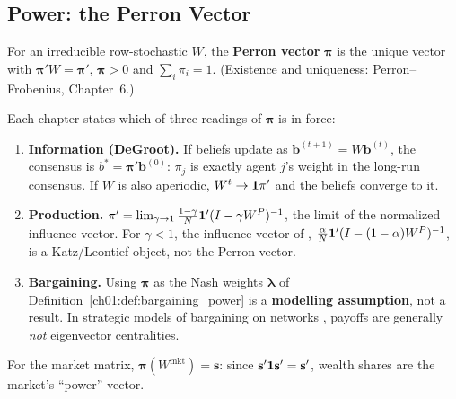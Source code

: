 \documentclass[../structural_economics_book.tex]{subfiles}
\begin{document}
\subsection{Power: the Perron Vector}

\begin{definition}\label{ch01:def:perron}
For an irreducible row-stochastic $W$, the \textbf{Perron vector} $\boldsymbol{\pi}$ is the unique vector with $\boldsymbol{\pi}'W = \boldsymbol{\pi}'$, $\boldsymbol{\pi} > 0$ and $\sum_i \pi_i = 1$. (Existence and uniqueness: Perron--Frobenius, Chapter~6.)
\end{definition}

Each chapter states which of three readings of $\boldsymbol{\pi}$ is in force:
\begin{enumerate}
\item \textbf{Information (DeGroot).} If beliefs update as $\mathbf{b}^{(t+1)} = W\mathbf{b}^{(t)}$, the consensus is $b^* = \boldsymbol{\pi}'\mathbf{b}^{(0)}$: $\pi_j$ is exactly agent $j$'s weight in the long-run consensus. If $W$ is also aperiodic, $W^t \to \mathbf{1}\pi'$ and the beliefs converge to it.
\item \textbf{Production.} $\pi' = \lim_{\gamma \to 1} \frac{1-\gamma}{N}\mathbf{1}'(I - \gamma W^P)^{-1}$, the limit of the normalized influence vector. For $\gamma < 1$, the influence vector of \citet{acemoglu2012network}, $\frac{\alpha}{N}\mathbf{1}'(I - (1-\alpha)W^P)^{-1}$, is a Katz/Leontief object, not the Perron vector.
\item \textbf{Bargaining.} Using $\boldsymbol{\pi}$ as the Nash weights $\boldsymbol{\lambda}$ of Definition~\ref{ch01:def:bargaining_power} is a \textbf{modelling assumption}, not a result. In strategic models of bargaining on networks \citep{manea2011bargaining,abreu2012bargaining,abreu2012markov}, payoffs are generally \textit{not} eigenvector centralities.
\end{enumerate}
For the market matrix, $\boldsymbol{\pi}(W^{\text{mkt}}) = \mathbf{s}$: since $\mathbf{s}'\mathbf{1}\mathbf{s}' = \mathbf{s}'$, wealth shares are the market's ``power'' vector.
\end{document}
